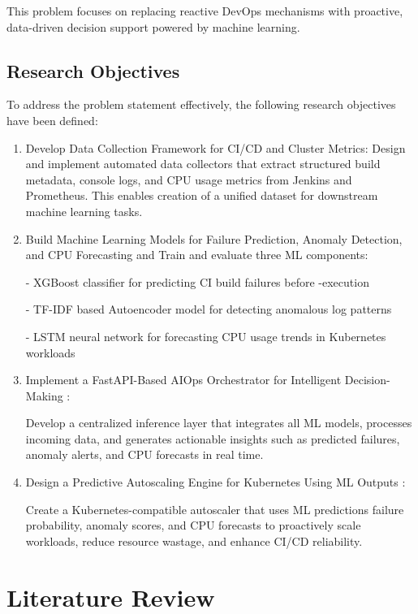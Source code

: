 \documentclass[12pt]{report}
\begin{document}
This problem focuses on replacing reactive DevOps mechanisms with proactive, data-driven decision support powered by machine learning.

\section{Research Objectives}
To address the problem statement effectively, the following research objectives have been defined:
\begin{enumerate}
    \item Develop Data Collection Framework for CI/CD and Cluster Metrics: Design and implement automated data collectors that extract structured build metadata, console logs, and CPU usage metrics from Jenkins and Prometheus. This enables creation of a unified dataset for downstream machine learning tasks.
    
    \item Build Machine Learning Models for Failure Prediction, Anomaly Detection, and CPU Forecasting and
    Train and evaluate three ML components:

- XGBoost classifier for predicting CI build failures before -execution

- TF-IDF based Autoencoder model for detecting anomalous log patterns

- LSTM neural network for forecasting CPU usage trends in Kubernetes workloads
    
    \item Implement a FastAPI-Based AIOps Orchestrator for Intelligent Decision-Making :

Develop a centralized inference layer that integrates all ML models, processes incoming data, and generates actionable insights such as predicted failures, anomaly alerts, and CPU forecasts in real time.
    
    \item Design a Predictive Autoscaling Engine for Kubernetes Using ML Outputs :

Create a Kubernetes-compatible autoscaler that uses ML predictions failure probability, anomaly scores, and CPU forecasts to proactively scale workloads, reduce resource wastage, and enhance CI/CD reliability.
    
\end{enumerate}

\clearpage
\chapter{Literature Review}
\end{document}
